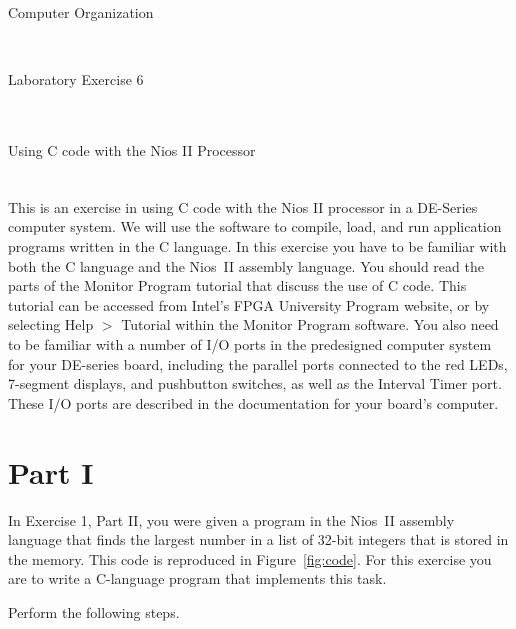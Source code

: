 \documentclass[epsfig,10pt,fullpage]{article}
\newcommand{\LabNum}{6}
\begin{document}
\centerline{\huge Computer Organization}
~\\
\centerline{\huge Laboratory Exercise \LabNum}
~\\
\centerline{\large Using C code with the Nios\textsuperscript{\textregistered} II Processor}
~\\


This is an exercise in using C code with the Nios\textsuperscript{\textregistered} II processor
in a DE-Series computer system. 
We will use the {\it \productNameMedTM{}} software to compile, load,
and run application programs written in the C language.  In this exercise
you have to be familiar with both the C language and the Nios~II assembly language.
You should read the parts of the Monitor Program tutorial that discuss the use of C code.  
This tutorial can be accessed from Intel's FPGA University Program website, or by selecting
{\sf Help $>$ Tutorial} within the Monitor Program software. You also need to be familiar
with a number of I/O ports in the predesigned computer system for your DE-series board,
including the parallel ports connected to the red LEDs, 7-segment displays, and pushbutton switches,
as well as the Interval Timer port. These I/O ports are described in the documentation for your board's computer. 

\section*{Part I}
In Exercise 1, Part II, you were given a program in the Nios~II assembly language that finds the 
largest number in a list of 32-bit integers that is stored in the memory. This code is 
reproduced in Figure~\ref{fig:code}. For this exercise you are to write a C-language program 
that implements this task.

Perform the following steps.
\end{document}
